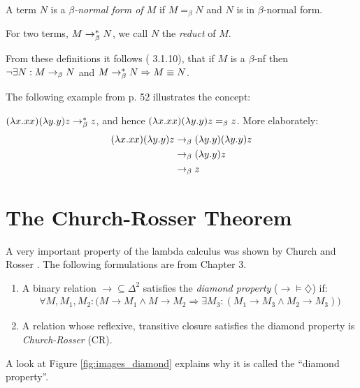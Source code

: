 \begin{definition}
	A term $N$ is a \emph{$\beta$-normal form of $M$} if $M=_\beta N$ and $N$ is in $\beta$-normal form.
\end{definition}
\begin{definition}
	For two terms, $M\rightarrow_\beta^* N$, we call $N$ the \emph{reduct} of $M$.
\end{definition}
From these definitions it follows (\cite{Barendregt} 3.1.10), that if $M$ is a
$\beta$-nf then $\neg\exists N:M\rightarrow_\beta N$ and $M\rightarrow_\beta^* N\Rightarrow M\equiv N$.

The following example from \cite{Barendregt} p. 52 illustrates the concept:
\begin{example}
	$(\lambda x.xx)(\lambda y.y)z\rightarrow_\beta^* z$, and hence $(\lambda x.xx)(\lambda y.y)z =_\beta z$.
	More elaborately:
\begin{align*}
	(\lambda x.xx)(\lambda y.y)z&\rightarrow_\beta(\lambda y.y)(\lambda y.y)z \\
	&\rightarrow_\beta(\lambda y.y)z \\
	&\rightarrow_\beta z
\end{align*}
\end{example}

\section{The Church-Rosser Theorem}

A very important property of the lambda calculus was shown by Church and
Rosser \cite{Church1936}. The following formulations are from
\cite{Barendregt} Chapter 3.

\begin{definition}\mbox{}
	\begin{enumerate}
	\item A binary relation $\rightarrow\subseteq\Delta^2$ satisfies the \emph{diamond property}
	($\rightarrow\models\diamondsuit$) if:
	\begin{align*}
		\forall M,M_1,M_2 : \big(M\rightarrow M_1\wedge M\rightarrow M_2
		\Rightarrow \exists M_3 : \left(M_1\rightarrow M_3 \wedge M_2 \rightarrow M_3\right) \big)
	\end{align*}
	
	\item A relation whose reflexive, transitive closure satisfies the diamond property
	is \emph{Church-Rosser} (CR).
	\end{enumerate}
\end{definition}

A look at Figure \ref{fig:images_diamond} explains why it is called the ``diamond property''.

